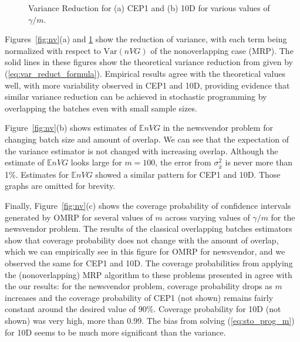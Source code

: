 \documentclass[11pt]{article}
\newcommand{\e}[1]{\mathbb{E} %
#1 %
}
\newcommand{\var}[1]{\mathrm{Var} \left( #1 \right)}
\newcommand{\x}{x} %
\newcommand{\xh}{{\hat{\x}}}
\begin{document}
\begin{figure}[htb!]
	\centering
		\caption{
		Variance Reduction for
		(a) CEP1 and 
		(b) 10D
		for various values of $\gamma / m$.
		}
\label{fig:varvar}
\end{figure}


Figures~\ref{fig:nv}(a) and \ref{fig:varvar} show the reduction of variance, with each term being normalized with respect to $\var{nVG}$ of the nonoverlapping case (MRP). 
The solid lines in these figures show the theoretical variance reduction from \cite{Welch1987} given by (\ref{eq:var_reduct_formula}). 
Empirical results agree with the theoretical values well, with more variability observed in CEP1 and 10D, providing evidence that similar variance reduction can be achieved in stochastic programming by overlapping the batches even with small sample sizes. 

Figure~\ref{fig:nv}(b) shows estimates of $\e{nVG}$ in the newsvendor problem for changing batch size and amount of overlap. 
We can see that the expectation of the variance estimator is not changed with increasing overlap. 
Although the estimate of $\e{nVG}$ looks large for $m=100$, the error from $\sigma^2_\xh$ is never more than 1\%.  
Estimates for $\e{nVG}$ showed a similar pattern for CEP1 and 10D.  Those graphs are omitted for brevity.

Finally, Figure~\ref{fig:nv}(c) shows the coverage probability of confidence intervals generated by OMRP for several values of $m$ across varying values of $\gamma/m$ for the newsvendor problem.  
The results of the classical overlapping batches estimators show that coverage probability does not change with the amount of overlap, which we can  empirically see in this figure for OMRP for newsvendor, and we observed the same for CEP1 and 10D.  
The coverage probabilities from applying the (nonoverlapping) MRP algorithm to these problems presented in \cite{Bayraksan2006} agree with the our results: for the newsvendor problem, coverage probability drops as $m$ increases and the coverage probability of CEP1 (not shown) remains fairly constant around the desired value of $90\%$. 
Coverage probability for 10D (not shown) was very high, more than $0.99$.  The bias from solving (\ref{eq:sto_prog_m}) for 10D seems to be much more significant than the variance.
\end{document}
